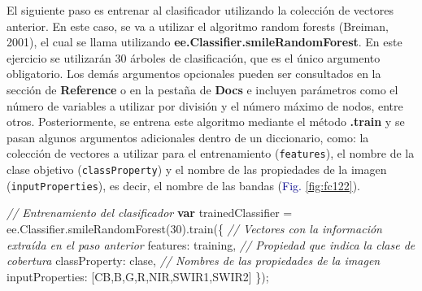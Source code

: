 \documentclass[
  12pt,
  letterpaper,
  twoside]{book}
\newenvironment{Shaded}{\begin{snugshade}}{\end{snugshade}}
\newcommand{\AttributeTok}[1]{\textcolor[rgb]{0.48,0.12,0.64}{#1}}
\newcommand{\CommentTok}[1]{\textcolor[rgb]{0.24,0.58,0.00}{\textit{#1}}}
\newcommand{\ControlFlowTok}[1]{\textcolor[rgb]{0.00,0.00,0.00}{\textbf{#1}}}
\newcommand{\DataTypeTok}[1]{\textcolor[rgb]{0.00,0.00,0.00}{#1}}
\newcommand{\DecValTok}[1]{\textcolor[rgb]{0.28,0.53,0.93}{#1}}
\newcommand{\FunctionTok}[1]{\textcolor[rgb]{0.48,0.12,0.64}{#1}}
\newcommand{\KeywordTok}[1]{\textcolor[rgb]{0.48,0.12,0.64}{#1}}
\newcommand{\NormalTok}[1]{#1}
\newcommand{\OperatorTok}[1]{\textcolor[rgb]{0.00,0.00,0.00}{#1}}
\newcommand{\StringTok}[1]{\textcolor[rgb]{0.87,0.29,0.22}{#1}}
\newcommand\boldpurple[1]{\textcolor{darkpurple}{\textbf{#1}}}
\begin{document}
El siguiente paso es entrenar al clasificador utilizando la colección de vectores anterior. En este caso, se va a utilizar el algoritmo random forests (Breiman, 2001), el cual se llama utilizando \boldpurple{ee.Classifier.smileRandomForest}. En este ejercicio se utilizarán 30 árboles de clasificación, que es el único argumento obligatorio. Los demás argumentos opcionales pueden ser consultados en la sección de \textbf{Reference} o en la pestaña de \textbf{Docs} e incluyen parámetros como el número de variables a utilizar por división y el número máximo de nodos, entre otros. Posteriormente, se entrena este algoritmo mediante el método \boldpurple{.train} y se pasan algunos argumentos adicionales dentro de un diccionario, como: la colección de vectores a utilizar para el entrenamiento (\texttt{features}), el nombre de la clase objetivo (\texttt{classProperty}) y el nombre de las propiedades de la imagen (\texttt{inputProperties}), es decir, el nombre de las bandas (\textcolor{darkblue}{Fig.} \ref{fig:fc122}).

\begin{Shaded}
\begin{Highlighting}[]
\CommentTok{// Entrenamiento del clasificador}
\ControlFlowTok{var}\NormalTok{ trainedClassifier }\OperatorTok{=} \KeywordTok{ee}\OperatorTok{.}\AttributeTok{Classifier}\OperatorTok{.}\FunctionTok{smileRandomForest}\NormalTok{(}\DecValTok{30}\NormalTok{)}\OperatorTok{.}\FunctionTok{train}\NormalTok{(\{}
  \CommentTok{// Vectores con la información extraída en el paso anterior}
  \DataTypeTok{features}\OperatorTok{:}\NormalTok{ training}\OperatorTok{,}
  \CommentTok{// Propiedad que indica la clase de cobertura}
  \DataTypeTok{classProperty}\OperatorTok{:} \StringTok{\textquotesingle{}clase\textquotesingle{}}\OperatorTok{,}
  \CommentTok{// Nombres de las propiedades de la imagen}
  \DataTypeTok{inputProperties}\OperatorTok{:}\NormalTok{ [}\StringTok{\textquotesingle{}CB\textquotesingle{}}\OperatorTok{,}\StringTok{\textquotesingle{}B\textquotesingle{}}\OperatorTok{,}\StringTok{\textquotesingle{}G\textquotesingle{}}\OperatorTok{,}\StringTok{\textquotesingle{}R\textquotesingle{}}\OperatorTok{,}\StringTok{\textquotesingle{}NIR\textquotesingle{}}\OperatorTok{,}\StringTok{\textquotesingle{}SWIR1\textquotesingle{}}\OperatorTok{,}\StringTok{\textquotesingle{}SWIR2\textquotesingle{}}\NormalTok{]}
\NormalTok{\})}\OperatorTok{;}
\end{Highlighting}
\end{Shaded}
\end{document}
